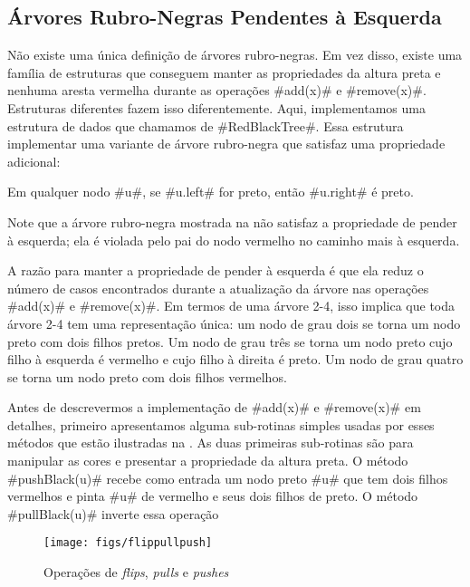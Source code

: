 \subsection{Árvores Rubro-Negras Pendentes à Esquerda}

%
%
Não existe uma única definição de 
árvores rubro-negras. Em vez disso, existe uma família
de estruturas que conseguem manter as propriedades da altura preta
e nenhuma aresta vermelha 
durante as operações #add(x)# e #remove(x)#. Estruturas diferentes fazem isso diferentemente. 
Aqui, implementamos uma estrutura de dados que chamamos de 
#RedBlackTree#.
%
Essa estrutura implementar uma variante de árvore rubro-negra que satisfaz
uma propriedade adicional:
\begin{prp}
  Em qualquer nodo #u#, se #u.left# for preto, então #u.right# é preto. 
\end{prp}
Note que a árvore rubro-negra mostrada na 
  não satisfaz a propriedade de pender 
à esquerda; 
ela é violada pelo pai do nodo vermelho no caminho mais à esquerda.

A razão para manter a propriedade de pender à esquerda é que ela reduz
o número de casos encontrados durante a atualização da árvore nas operações
#add(x)#
e #remove(x)#.  Em termos de uma árvore 2-4, isso implica que toda árvore 2-4 tem uma representação única: um nodo de grau dois se torna um nodo preto com dois filhos pretos.
Um nodo de grau três se torna um nodo preto cujo filho à esquerda é vermelho 
e cujo filho à direita é preto.
Um nodo de grau quatro se torna um nodo preto com dois filhos vermelhos.

Antes de descrevermos a implementação de 
 #add(x)# e #remove(x)# em detalhes, primeiro apresentamos alguma sub-rotinas
 simples usadas por esses métodos que estão ilustradas na 
 .  As duas primeiras sub-rotinas são para manipular
 as cores e presentar a propriedade da altura preta.
 O método 
#pushBlack(u)# recebe como entrada um nodo preto #u#
que tem dois filhos vermelhos e pinta #u# de vermelho e seus dois filhos de preto.
O método 
#pullBlack(u)# inverte essa operação

\begin{figure}
  \begin{center}
    \texttt{[image: figs/flippullpush]}
  \end{center}
  \caption{Operações de \emph{flips}, \emph{pulls} e \emph{pushes}}
\end{figure}

